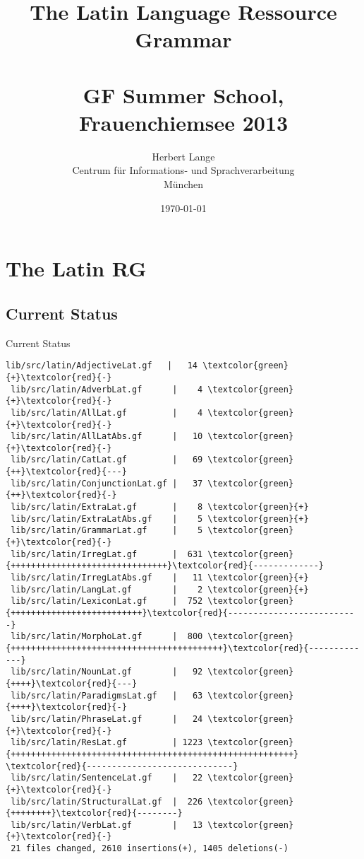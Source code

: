 \documentclass{beamer}
\title[The Latin Language Ressource Grammar]{The Latin Language Ressource Grammar\\\quad \\ \small{ GF Summer School, Frauenchiemsee 2013 }}
\author{Herbert Lange\\Centrum für Informations- und Sprachverarbeitung\\München}
\date{\today}
\begin{document}
\frame{\titlepage}

\section{The Latin RG}
\begin{frame}
\tableofcontents
\end{frame}
\subsection{Current Status}
\begin{frame}[fragile]{Current Status}
\begin{Verbatim}[fontsize=\tiny,commandchars=\\\{\}]
 lib/src/latin/AdjectiveLat.gf   |   14 \textcolor{green}{+}\textcolor{red}{-}
 lib/src/latin/AdverbLat.gf      |    4 \textcolor{green}{+}\textcolor{red}{-}
 lib/src/latin/AllLat.gf         |    4 \textcolor{green}{+}\textcolor{red}{-}
 lib/src/latin/AllLatAbs.gf      |   10 \textcolor{green}{+}\textcolor{red}{-}
 lib/src/latin/CatLat.gf         |   69 \textcolor{green}{++}\textcolor{red}{---}
 lib/src/latin/ConjunctionLat.gf |   37 \textcolor{green}{++}\textcolor{red}{-}
 lib/src/latin/ExtraLat.gf       |    8 \textcolor{green}{+}
 lib/src/latin/ExtraLatAbs.gf    |    5 \textcolor{green}{+}
 lib/src/latin/GrammarLat.gf     |    5 \textcolor{green}{+}\textcolor{red}{-}
 lib/src/latin/IrregLat.gf       |  631 \textcolor{green}{+++++++++++++++++++++++++++++++}\textcolor{red}{-------------}
 lib/src/latin/IrregLatAbs.gf    |   11 \textcolor{green}{+}
 lib/src/latin/LangLat.gf        |    2 \textcolor{green}{+}
 lib/src/latin/LexiconLat.gf     |  752 \textcolor{green}{++++++++++++++++++++++++++}\textcolor{red}{--------------------------}
 lib/src/latin/MorphoLat.gf      |  800 \textcolor{green}{++++++++++++++++++++++++++++++++++++++++++}\textcolor{red}{-------------}
 lib/src/latin/NounLat.gf        |   92 \textcolor{green}{++++}\textcolor{red}{---}
 lib/src/latin/ParadigmsLat.gf   |   63 \textcolor{green}{++++}\textcolor{red}{-}
 lib/src/latin/PhraseLat.gf      |   24 \textcolor{green}{+}\textcolor{red}{-}
 lib/src/latin/ResLat.gf         | 1223 \textcolor{green}{++++++++++++++++++++++++++++++++++++++++++++++++++++++++}
\textcolor{red}{-----------------------------}
 lib/src/latin/SentenceLat.gf    |   22 \textcolor{green}{+}\textcolor{red}{-}
 lib/src/latin/StructuralLat.gf  |  226 \textcolor{green}{++++++++}\textcolor{red}{--------}
 lib/src/latin/VerbLat.gf        |   13 \textcolor{green}{+}\textcolor{red}{-}
 21 files changed, 2610 insertions(+), 1405 deletions(-)
\end{Verbatim}
\end{frame}
\end{document}
